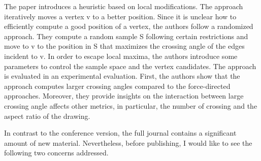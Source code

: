 \documentclass{article}
\begin{document}
The paper introduces a heuristic based on local modifications. The approach iteratively moves a vertex v to a better position. Since it is unclear how to efficiently compute a good position of a vertex, the authors follow a randomized approach. They compute a random sample S following certain restrictions and move to v to the position in S that maximizes the crossing angle of the edges incident to v. In order to escape local maxima, the authors introduce some parameters to control the sample space and the vertex candidates. The approach is evaluated in an experimental evaluation. First, the authors show that the approach computes larger crossing angles compared to the force-directed approaches. Moreover, they provide insights on the interaction between large crossing angle affects other metrics, in particular, the number of crossing and the aspect ratio of the drawing.

In contrast to the conference version, the full journal contains a significant amount of new material. Nevertheless, before publishing, I would like to see the following two concerns addressed.
\end{document}
